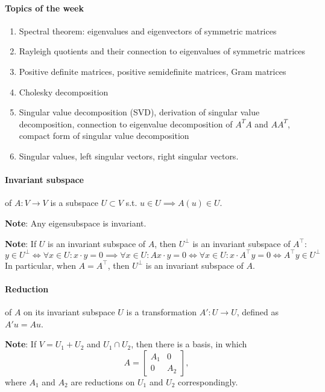\documentclass{article}
\begin{document}
\paragraph{Topics of the week} 

\begin{enumerate}
    \item Spectral theorem: eigenvalues and eigenvectors of symmetric matrices
    \item Rayleigh quotients and their connection to eigenvalues of symmetric matrices
    \item Positive definite matrices, positive semidefinite matrices, Gram matrices
    \item Cholesky decomposition
    \item Singular value decomposition (SVD), derivation of singular value decomposition, connection to eigenvalue decomposition of $A^TA$ and $AA^T$, compact form of singular value decomposition
    \item Singular values, left singular vectors, right singular vectors.
\end{enumerate}

\paragraph{Invariant subspace} of $A : V \to V$ is a subspace $U \subset V$ s.t. $u \in U \implies A(u) \in U$.

\textbf{Note}: Any eigensubspace is invariant.

\textbf{Note}: If $U$ is an invariant subspace of $A$, then $U^\perp$ is an invariant subspace of $A^\top$:
$$
y \in U^\perp \iff \forall x \in U: x \cdot y = 0 \implies \forall x \in U: Ax \cdot y = 0 \iff \forall x \in U : x \cdot A^\top y = 0 \iff A^\top y \in U^\perp
$$
In particular, when $A=A^\top$, then $U^\perp$ is an invariant subspace of $A$.

\paragraph{Reduction} of $A$ on its invariant subspace $U$ is a transformation $A' : U \to U$, defined as $A'u = Au$.

\textbf{Note}: If $V = U_1 + U_2$ and $U_1 \cap U_2$, then there is a basis, in which
$$
A = \begin{bmatrix}
    A_1 & 0 \\ 0 & A_2
\end{bmatrix},
$$
where $A_1$ and $A_2$ are reductions on $U_1$ and $U_2$ correspondingly.
\end{document}
